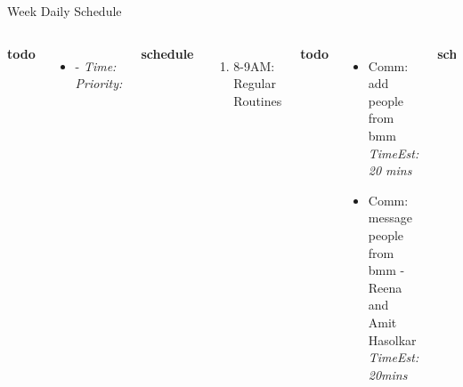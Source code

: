 \documentclass[serif, mathserif, final]{beamer}
\newcommand{\timeEst}[1]{\textit{Time:} \textit{#1}}
\newcommand{\te}[1]{\textit{TimeEst:} \textit{#1}}
\newcommand{\priority}[1]{\textit{Priority:} \textit{#1}}
\newcommand{\deadline}[1]{#1}
\begin{document}
\begin{frame}{}
\begin{columns}
\begin{column}{0.50\linewidth}
\begin{block}{Week Daily Schedule}
\begin{columns}
          \textbf{\small todo}\\ 
          \begin{itemize}
            \tiny \item \tiny -  \deadline{ }   \timeEst{} \priority{} 
          \end{itemize}
          \textbf{\small schedule}\\
          \begin{enumerate}
            \tiny \item \tiny 8-9AM: Regular Routines 
          \end{enumerate}
          
          \textbf{\small todo}\\
          \begin{itemize} 
          \item \tiny Comm: add people from bmm \te{20 mins} 
          \item \tiny Comm: message people from bmm - Reena and Amit
            Hasolkar  \te{20mins} 
          \end{itemize}
          \textbf{\small schedule}\\ 
          \begin{enumerate}
            \tiny \item \tiny 7-7:30PM = food + organize.  
            \tiny \item \tiny 7:30PM -8PM = go to PF chang's and get
            alcohol. 
            \tiny \item \tiny 8PM -9PM = TM prep. 
            \tiny \item \tiny 9:45PM - 10:30PM = go out 
            \tiny \item \tiny 2AM -3AM =  message Samir + add people
            from BMM
          \end{enumerate}
          
          \textbf{\small todo}\\
          \begin{itemize} 
          \item \tiny Work:comm: get ref letter from Maria Garzaran 
          \item \tiny Mgmt:Spaces: figure out return trip  
          \item \tiny Comm: add people from convention 
          \item \tiny Mgmt:webpresence: update fb pic 
            

\end{itemize}
\end{columns}
\end{block}
\end{column}
\end{columns}
\end{frame}
\end{document}
